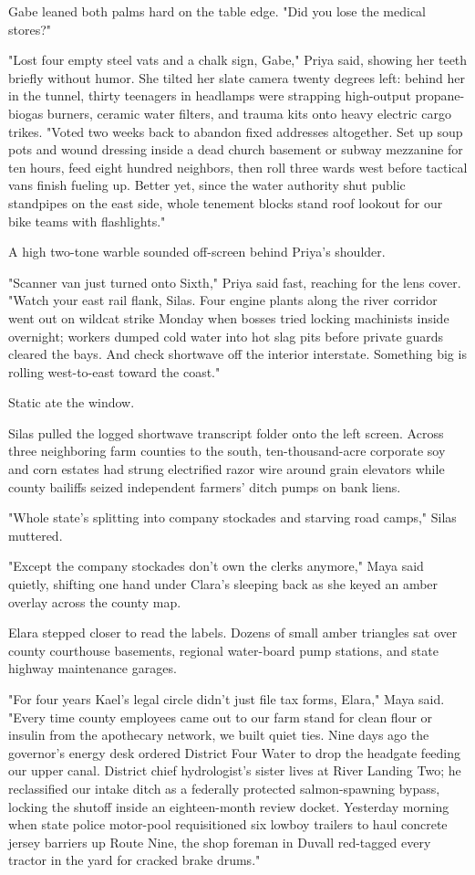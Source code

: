 Gabe leaned both palms hard on the table edge. "Did you lose the medical stores?"

"Lost four empty steel vats and a chalk sign, Gabe," Priya said, showing her teeth briefly without humor. She tilted her slate camera twenty degrees left: behind her in the tunnel, thirty teenagers in headlamps were strapping high-output propane-biogas burners, ceramic water filters, and trauma kits onto heavy electric cargo trikes. "Voted two weeks back to abandon fixed addresses altogether. Set up soup pots and wound dressing inside a dead church basement or subway mezzanine for ten hours, feed eight hundred neighbors, then roll three wards west before tactical vans finish fueling up. Better yet, since the water authority shut public standpipes on the east side, whole tenement blocks stand roof lookout for our bike teams with flashlights."

A high two-tone warble sounded off-screen behind Priya's shoulder.

"Scanner van just turned onto Sixth," Priya said fast, reaching for the lens cover. "Watch your east rail flank, Silas. Four engine plants along the river corridor went out on wildcat strike Monday when bosses tried locking machinists inside overnight; workers dumped cold water into hot slag pits before private guards cleared the bays. And check shortwave off the interior interstate. Something big is rolling west-to-east toward the coast."

Static ate the window.

Silas pulled the logged shortwave transcript folder onto the left screen. Across three neighboring farm counties to the south, ten-thousand-acre corporate soy and corn estates had strung electrified razor wire around grain elevators while county bailiffs seized independent farmers' ditch pumps on bank liens.

"Whole state's splitting into company stockades and starving road camps," Silas muttered.

"Except the company stockades don't own the clerks anymore," Maya said quietly, shifting one hand under Clara's sleeping back as she keyed an amber overlay across the county map.

Elara stepped closer to read the labels. Dozens of small amber triangles sat over county courthouse basements, regional water-board pump stations, and state highway maintenance garages.

"For four years Kael's legal circle didn't just file tax forms, Elara," Maya said. "Every time county employees came out to our farm stand for clean flour or insulin from the apothecary network, we built quiet ties. Nine days ago the governor's energy desk ordered District Four Water to drop the headgate feeding our upper canal. District chief hydrologist's sister lives at River Landing Two; he reclassified our intake ditch as a federally protected salmon-spawning bypass, locking the shutoff inside an eighteen-month review docket. Yesterday morning when state police motor-pool requisitioned six lowboy trailers to haul concrete jersey barriers up Route Nine, the shop foreman in Duvall red-tagged every tractor in the yard for cracked brake drums."

